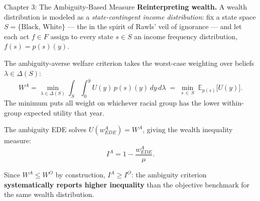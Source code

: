 \documentclass{beamer}
\begin{document}
\begin{frame}[label=ch3-ambiguity-derive]{Chapter 3: The Ambiguity-Based Measure}
  \scriptsize
  \textbf{Reinterpreting wealth.} A wealth distribution is modeled as a \textit{state-contingent income distribution}: fix a state space $S = \{\text{Black},\,\text{White}\}$ --- the  in the spirit of Rawls' veil of ignorance --- and let each act $f \in F$ assign to every state $s \in S$ an income frequency distribution, $f(s) = p(s)(y)$.

  \vspace{0.4em}
  The ambiguity-averse welfare criterion takes the worst-case weighting over beliefs $\lambda \in \Delta(S)$:
  $$W^A = \min_{\lambda \in \Delta(S)} \int_S \int_0^{\bar{y}} U(y)\,p(s)(y)\,dy\,d\lambda \;=\; \min_{s\,\in\, S}\;\mathbb{E}_{p(s)}\bigl[U(y)\bigr].$$
  The minimum puts all weight on whichever racial group has the lower within-group expected utility that year.

  \vspace{0.4em}
  The ambiguity EDE solves $U(w^A_{EDE}) = W^A$, giving the wealth inequality measure:
  $$I^A = 1 - \frac{w^A_{EDE}}{\mu}.$$

  \vspace{0.2em}
  Since $W^A \leq W^O$ by construction, $I^A \geq I^O$: the ambiguity criterion \textbf{systematically reports higher inequality} than the objective benchmark for the same wealth distribution.
\end{frame}
\end{document}
